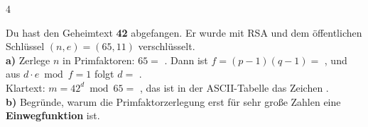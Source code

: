 \documentclass[11pt,a4paper]{article}
\begin{document}
\begin{aufgabe}{4}
{\lueckentext Du hast den Geheimtext \textbf{42} abgefangen. Er wurde mit RSA und dem öffentlichen Schlüssel $(n, e) = (65, 11)$ verschlüsselt.\\
\textbf{a)} Zerlege $n$ in Primfaktoren: $65 =$ . Dann ist $f = (p-1)(q-1) =$ , und aus $d\cdot e \bmod f = 1$ folgt $d =$ .\\
Klartext: $m = 42^{d} \bmod 65 =$ , das ist in der ASCII-Tabelle das Zeichen .\\
\textbf{b)} Begründe, warum die Primfaktorzerlegung erst für sehr große Zahlen eine \textbf{Einwegfunktion} ist.\par}
\end{aufgabe}

\vfill
{}
\end{document}
